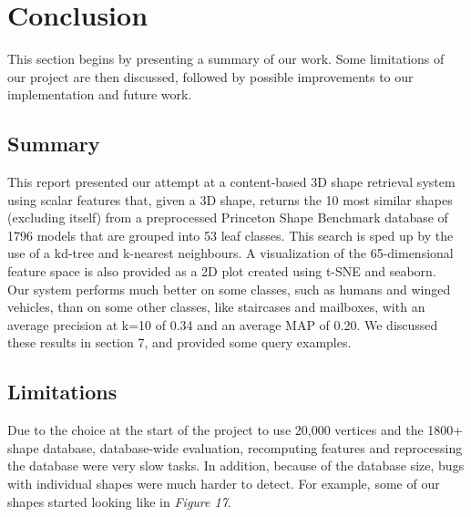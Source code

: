 \documentclass{bigdata}
\begin{document}
\section{Conclusion}
This section begins by presenting a summary of our work. Some limitations of our project are then discussed, followed by possible improvements to our implementation and future work.
\subsection{Summary}
This report presented our attempt at a content-based 3D shape retrieval system using scalar features that, given a 3D shape, returns the 10 most similar shapes (excluding itself) from a preprocessed Princeton Shape Benchmark database of 1796 models that are grouped into 53 leaf classes. This search is sped up by the use of a kd-tree and k-nearest neighbours. A visualization of the 65-dimensional feature space is also provided as a 2D plot created using t-SNE and seaborn. \\
Our system performs much better on some classes, such as humans and winged vehicles, than on some other classes, like staircases and mailboxes, with an average precision at k=10 of 0.34 and an average MAP of 0.20. We discussed these results in section 7, and provided some query examples.

\subsection{Limitations}

Due to the choice at the start of the project to use 20,000 vertices and the 1800+ shape database, database-wide evaluation, recomputing features and reprocessing the database were very slow tasks. In addition, because of the database size, bugs with individual shapes were much harder to detect. For example, some of our shapes started looking like in \textit{Figure 17}.
\end{document}

